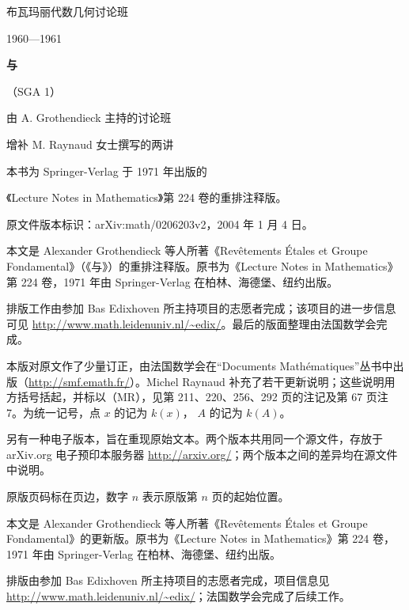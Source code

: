 \begin{center}
{\Large 布瓦玛丽代数几何讨论班}\par
1960—1961\par\bigskip
{\LARGE\bfseries {}与}\par
（SGA 1）\par\bigskip
由 A. Grothendieck 主持的讨论班\par
增补 M. Raynaud 女士撰写的两讲\par\bigskip
本书为 Springer-Verlag 于 1971 年出版的\par
《Lecture Notes in Mathematics》第 224 卷的重排注释版。\par
原文件版本标识：arXiv:math/0206203v2，2004 年 1 月 4 日。
\end{center}

本文是 Alexander Grothendieck 等人所著《Revêtements Étales et Groupe Fondamental》（《与》）的重排注释版。原书为《Lecture Notes in Mathematics》第 224 卷，1971 年由 Springer-Verlag 在柏林、海德堡、纽约出版。

\LaTeXe{} 排版工作由参加 Bas Edixhoven 所主持项目的志愿者完成；该项目的进一步信息可见 \url{http://www.math.leidenuniv.nl/~edix/}。最后的版面整理由法国数学会完成。

本版对原文作了少量订正，由法国数学会在“Documents Mathématiques”丛书中出版（\url{http://smf.emath.fr/}）。Michel Raynaud 补充了若干更新说明；这些说明用方括号括起，并标以（MR），见第 211、220、256、292 页的注记及第 67 页注 7。为统一记号，点 $x$ 的记为 $k(x)$， $A$ 的记为 $k(A)$。

另有一种电子版本，旨在重现原始文本。两个版本共用同一个源文件，存放于 arXiv.org 电子预印本服务器 \url{http://arxiv.org/}；两个版本之间的差异均在源文件中说明。

原版页码标在页边，数字 $n$ 表示原版第 $n$ 页的起始位置。

本文是 Alexander Grothendieck 等人所著《Revêtements Étales et Groupe Fondamental》的更新版。原书为《Lecture Notes in Mathematics》第 224 卷，1971 年由 Springer-Verlag 在柏林、海德堡、纽约出版。

\LaTeXe{} 排版由参加 Bas Edixhoven 所主持项目的志愿者完成，项目信息见 \url{http://www.math.leidenuniv.nl/~edix/}；法国数学会完成了后续工作。

